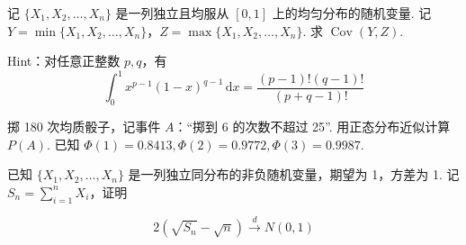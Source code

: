\documentclass{ctexart}
\begin{document}
记 $\{X_1, X_2, \ldots, X_n\}$ 是一列独立且均服从 $[0,1]$ 上的均匀分布的随机变量. 记 $Y = \min\{X_1, X_2, \ldots, X_n\}$，$Z = \max\{X_1, X_2, \ldots, X_n\}$. 求 $\operatorname{Cov}(Y, Z)$.

Hint：对任意正整数 $p, q$，有
\[ \int_0^1 x^{p-1}(1-x)^{q-1}\,\mathrm{d}x = \frac{(p-1)!(q-1)!}{(p+q-1)!} \]

掷 180 次均质骰子，记事件 $A$：“掷到 6 的次数不超过 25”. 用正态分布近似计算 $P(A)$. 已知 $\Phi(1) = 0.8413, \Phi(2) = 0.9772, \Phi(3) = 0.9987$.

已知 $\{X_1, X_2, \ldots, X_n\} $ 是一列独立同分布的非负随机变量，期望为 1，方差为 1. 记 $S_n = \displaystyle\sum_{i=1}^n X_i$，证明

\[ 2\left(\sqrt{S_n} - \sqrt{n}\right) \xrightarrow{d} N(0, 1) \]
\end{document}
